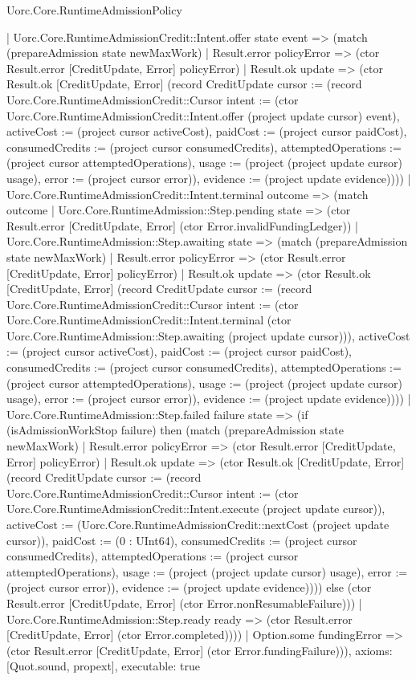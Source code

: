 \begin{lexlean}{Uorc.Core.RuntimeAdmissionPolicy}
\begin{semanticmodule}
{      | Uorc.Core.RuntimeAdmissionCredit::Intent.offer state event => (match (prepareAdmission state newMaxWork)
        | Result.error policyError => (ctor Result.error [CreditUpdate, Error] policyError)
        | Result.ok update => (ctor Result.ok [CreditUpdate, Error] (record CreditUpdate {cursor := (record Uorc.Core.RuntimeAdmissionCredit::Cursor {intent := (ctor Uorc.Core.RuntimeAdmissionCredit::Intent.offer (project update cursor) event), activeCost := (project cursor activeCost), paidCost := (project cursor paidCost), consumedCredits := (project cursor consumedCredits), attemptedOperations := (project cursor attemptedOperations), usage := (project (project update cursor) usage), error := (project cursor error)}), evidence := (project update evidence)})))
      | Uorc.Core.RuntimeAdmissionCredit::Intent.terminal outcome => (match outcome
        | Uorc.Core.RuntimeAdmission::Step.pending state => (ctor Result.error [CreditUpdate, Error] (ctor Error.invalidFundingLedger))
        | Uorc.Core.RuntimeAdmission::Step.awaiting state => (match (prepareAdmission state newMaxWork)
          | Result.error policyError => (ctor Result.error [CreditUpdate, Error] policyError)
          | Result.ok update => (ctor Result.ok [CreditUpdate, Error] (record CreditUpdate {cursor := (record Uorc.Core.RuntimeAdmissionCredit::Cursor {intent := (ctor Uorc.Core.RuntimeAdmissionCredit::Intent.terminal (ctor Uorc.Core.RuntimeAdmission::Step.awaiting (project update cursor))), activeCost := (project cursor activeCost), paidCost := (project cursor paidCost), consumedCredits := (project cursor consumedCredits), attemptedOperations := (project cursor attemptedOperations), usage := (project (project update cursor) usage), error := (project cursor error)}), evidence := (project update evidence)})))
        | Uorc.Core.RuntimeAdmission::Step.failed failure state => (if (isAdmissionWorkStop failure) then (match (prepareAdmission state newMaxWork)
          | Result.error policyError => (ctor Result.error [CreditUpdate, Error] policyError)
          | Result.ok update => (ctor Result.ok [CreditUpdate, Error] (record CreditUpdate {cursor := (record Uorc.Core.RuntimeAdmissionCredit::Cursor {intent := (ctor Uorc.Core.RuntimeAdmissionCredit::Intent.execute (project update cursor)), activeCost := (Uorc.Core.RuntimeAdmissionCredit::nextCost (project update cursor)), paidCost := (0 : UInt64), consumedCredits := (project cursor consumedCredits), attemptedOperations := (project cursor attemptedOperations), usage := (project (project update cursor) usage), error := (project cursor error)}), evidence := (project update evidence)}))) else (ctor Result.error [CreditUpdate, Error] (ctor Error.nonResumableFailure)))
        | Uorc.Core.RuntimeAdmission::Step.ready ready => (ctor Result.error [CreditUpdate, Error] (ctor Error.completed))))
    | Option.some fundingError => (ctor Result.error [CreditUpdate, Error] (ctor Error.fundingFailure))),
  axioms: [Quot.sound, propext],
  executable: true
}


\end{semanticmodule}
\end{lexlean}
